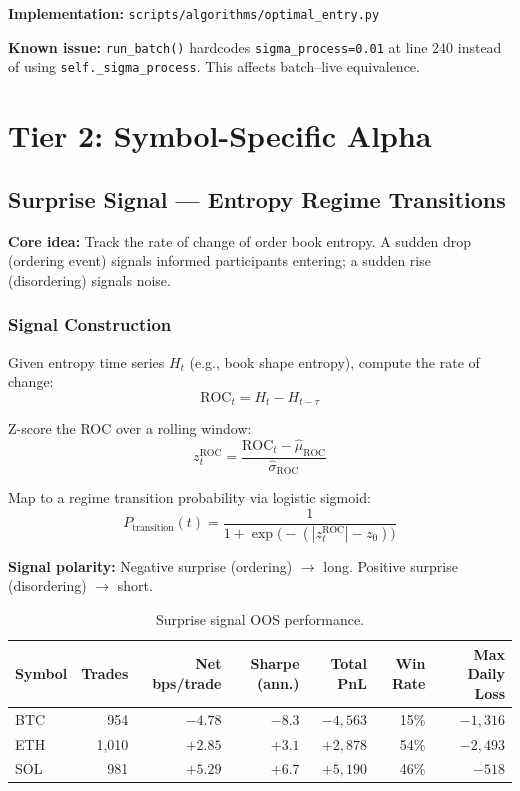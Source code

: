 \documentclass[11pt,a4paper]{article}
\newcommand{\toprule}{\hline\hline}
\newcommand{\midrule}{\hline}
\newcommand{\bottomrule}{\hline\hline}
\begin{document}
\textbf{Implementation:} \texttt{scripts/algorithms/optimal\_entry.py}

\textbf{Known issue:} \texttt{run\_batch()} hardcodes \texttt{sigma\_process=0.01} at line 240 instead of using \texttt{self.\_sigma\_process}. This affects batch--live equivalence.

\section{Tier 2: Symbol-Specific Alpha}

\subsection{Surprise Signal --- Entropy Regime Transitions}

\textbf{Core idea:} Track the rate of change of order book entropy. A sudden drop (ordering event) signals informed participants entering; a sudden rise (disordering) signals noise.

\subsubsection*{Signal Construction}

Given entropy time series $H_t$ (e.g., book shape entropy), compute the rate of change:
\begin{equation}
\text{ROC}_t = H_t - H_{t-\tau}
\end{equation}

Z-score the ROC over a rolling window:
\begin{equation}
z_t^{\text{ROC}} = \frac{\text{ROC}_t - \hat{\mu}_{\text{ROC}}}{\hat{\sigma}_{\text{ROC}}}
\end{equation}

Map to a regime transition probability via logistic sigmoid:
\begin{equation}
P_{\text{transition}}(t) = \frac{1}{1 + \exp\!\big(-(|z_t^{\text{ROC}}| - z_0)\big)}
\end{equation}

\textbf{Signal polarity:} Negative surprise (ordering) $\to$ long. Positive surprise (disordering) $\to$ short.

\begin{table}[h!]
\centering
\caption{Surprise signal OOS performance.}
\begin{tabular}{@{}lrrrrrr@{}}
\toprule
Symbol & Trades & Net bps/trade & Sharpe (ann.) & Total PnL & Win Rate & Max Daily Loss \\
\midrule
BTC & 954 & $-4.78$ & $-8.3$ & $-4{,}563$ & 15\% & $-1{,}316$ \\
ETH & 1{,}010 & $+2.85$ & $+3.1$ & $+2{,}878$ & 54\% & $-2{,}493$ \\
SOL & 981 & $+5.29$ & $+6.7$ & $+5{,}190$ & 46\% & $-518$ \\
\bottomrule
\end{tabular}
\end{table}
\end{document}

